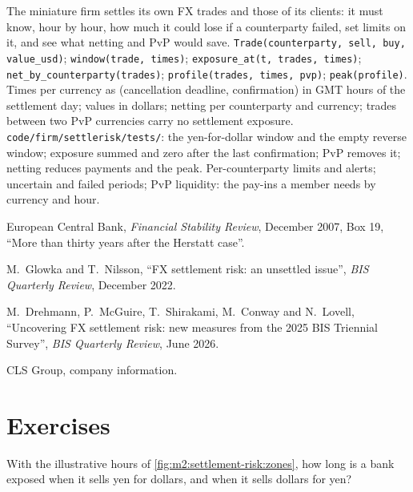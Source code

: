 \begin{build}
 The miniature firm settles its own FX trades and those of its
clients: it must know, hour by hour, how much it could lose if a counterparty
failed, set limits on it, and see what netting and PvP would save.
 \texttt{Trade(counterparty, sell, buy, value\_usd)};
\texttt{window(trade, times)}; \texttt{exposure\_at(t, trades, times)};
\texttt{net\_by\_counterparty(trades)}; \texttt{profile(trades, times, pvp)};
\texttt{peak(profile)}.
 Times per currency as (cancellation deadline, confirmation) in GMT
hours of the settlement day; values in dollars; netting per counterparty and
currency; trades between two PvP currencies carry no settlement exposure.
 \texttt{code/firm/settlerisk/tests/}: the yen-for-dollar
window and the empty reverse window; exposure summed and zero after the last
confirmation; PvP removes it; netting reduces payments and the peak.
 Per-counterparty limits and alerts; uncertain and failed periods;
PvP liquidity: the pay-ins a member needs by currency and hour.
\end{build}

\begin{omsources}
\item European Central Bank, \emph{Financial Stability Review}, December 2007,
Box 19, ``More than thirty years after the Herstatt case''.
\item M.~Glowka and T.~Nilsson, ``FX settlement risk: an unsettled issue'',
\emph{BIS Quarterly Review}, December 2022.
\item M.~Drehmann, P.~McGuire, T.~Shirakami, M.~Conway and N.~Lovell,
``Uncovering FX settlement risk: new measures from the 2025 BIS Triennial Survey'',
\emph{BIS Quarterly Review}, June 2026.
\item CLS Group, company information.
\end{omsources}

\section{Exercises}

\begin{exercise}[$\star$]\label{exo:m2:settlement-risk:1}
With the illustrative hours of \cref{fig:m2:settlement-risk:zones}, how long is a
bank exposed when it sells yen for dollars, and when it sells dollars for yen?
\end{exercise}

